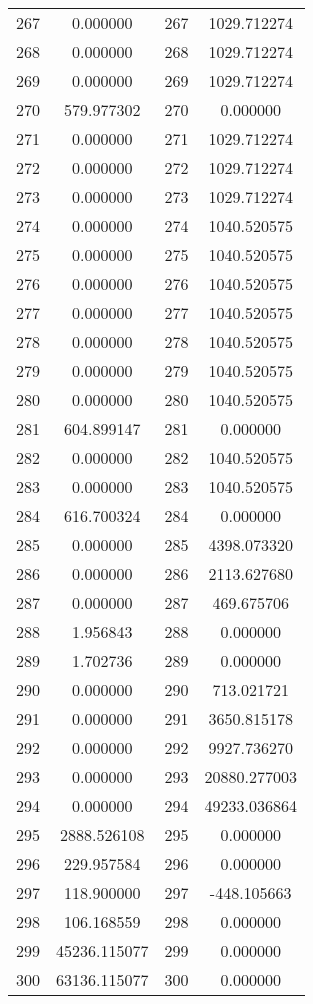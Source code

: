 \documentclass[12pt]{article}
\begin{document}
\begin{longtable}{@{}cccc@{}}
267 & 0.000000 & 267 & 1029.712274 \\
268 & 0.000000 & 268 & 1029.712274 \\
269 & 0.000000 & 269 & 1029.712274 \\
270 & 579.977302 & 270 & 0.000000 \\
271 & 0.000000 & 271 & 1029.712274 \\
272 & 0.000000 & 272 & 1029.712274 \\
273 & 0.000000 & 273 & 1029.712274 \\
274 & 0.000000 & 274 & 1040.520575 \\
275 & 0.000000 & 275 & 1040.520575 \\
276 & 0.000000 & 276 & 1040.520575 \\
277 & 0.000000 & 277 & 1040.520575 \\
278 & 0.000000 & 278 & 1040.520575 \\
279 & 0.000000 & 279 & 1040.520575 \\
280 & 0.000000 & 280 & 1040.520575 \\
281 & 604.899147 & 281 & 0.000000 \\
282 & 0.000000 & 282 & 1040.520575 \\
283 & 0.000000 & 283 & 1040.520575 \\
284 & 616.700324 & 284 & 0.000000 \\
285 & 0.000000 & 285 & 4398.073320 \\
286 & 0.000000 & 286 & 2113.627680 \\
287 & 0.000000 & 287 & 469.675706 \\
288 & 1.956843 & 288 & 0.000000 \\
289 & 1.702736 & 289 & 0.000000 \\
290 & 0.000000 & 290 & 713.021721 \\
291 & 0.000000 & 291 & 3650.815178 \\
292 & 0.000000 & 292 & 9927.736270 \\
293 & 0.000000 & 293 & 20880.277003 \\
294 & 0.000000 & 294 & 49233.036864 \\
295 & 2888.526108 & 295 & 0.000000 \\
296 & 229.957584 & 296 & 0.000000 \\
297 & 118.900000 & 297 & -448.105663 \\
298 & 106.168559 & 298 & 0.000000 \\
299 & 45236.115077 & 299 & 0.000000 \\
300 & 63136.115077 & 300 & 0.000000 \\

\end{longtable}
\end{document}

